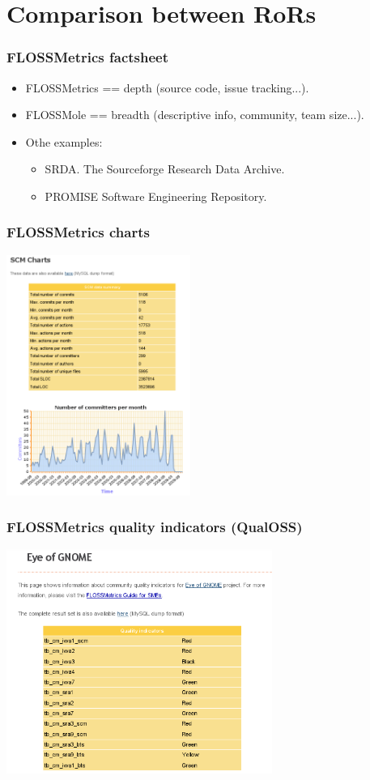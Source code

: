 \documentclass{beamer}
\begin{document}
\section{Comparison between RoRs}

\begin{frame}
\frametitle{FLOSSMetrics factsheet}
\begin{itemize}
\item FLOSSMetrics == depth (source code, issue tracking...).
\item FLOSSMole == breadth (descriptive info, community, team size...).
\item Othe examples:
\begin{itemize}
 \item SRDA. The Sourceforge Research Data Archive.
 \item PROMISE Software Engineering Repository.
\end{itemize}

\end{itemize}
\end{frame}

\begin{frame}
\frametitle{FLOSSMetrics charts}
\begin{center}
\includegraphics[width=0.45\textwidth]{figs/fm3-charts.png}
\end{center}
\end{frame}

\begin{frame}
\frametitle{FLOSSMetrics quality indicators (QualOSS)}
\begin{center}
\includegraphics[width=0.65\textwidth]{figs/fm3-quality-indicators.png}
\end{center}
\end{frame}
\end{document}
